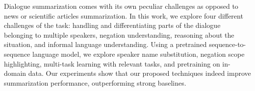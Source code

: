 Dialogue summarization comes with its own peculiar challenges as opposed to news or scientific articles summarization. In this work, we explore four different challenges of the task: handling and differentiating parts of the dialogue belonging to multiple speakers, negation understanding, reasoning about the situation, and informal language understanding. Using a pretrained sequence-to-sequence language model, we explore speaker name substitution, negation scope highlighting, multi-task learning with relevant tasks, and pretraining on in-domain data. Our experiments show that our proposed techniques indeed improve summarization performance, outperforming strong baselines.
